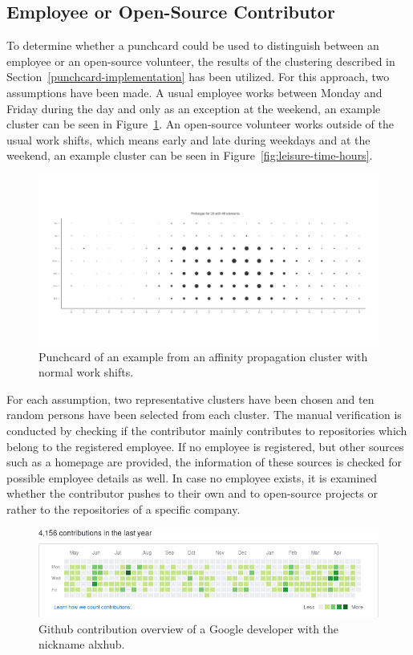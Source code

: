 \subsection{Employee or Open-Source Contributor}
To determine whether a punchcard could be used to distinguish between an employee or an open-source volunteer, the results of the clustering described in Section~\ref{punchcard-implementation} has been utilized.
For this approach, two assumptions have been made.
A usual employee works between Monday and Friday during the day and only as an exception at the weekend, an example cluster can be seen in Figure~\ref{fig:normal-office-hours}.
An open-source volunteer works outside of the usual work shifts, which means early and late during weekdays and at the weekend, an example cluster can be seen in Figure~\ref{fig:leisure-time-hours}.

\begin{figure}[H]
    \includegraphics[scale=0.32]{./graphs/analysis-affinity/28}
    \centering
    \caption{Punchcard of an example from an affinity propagation cluster with normal work shifts.}\label{fig:normal-office-hours}
\end{figure}

For each assumption, two representative clusters have been chosen and ten random persons have been selected from each cluster.
The manual verification is conducted by checking if the contributor mainly contributes to repositories which belong to the registered employee.
If no employee is registered, but other sources such as a homepage are provided, the information of these sources is checked for possible employee details as well.
In case no employee exists, it is examined whether the contributor pushes to their own and to open-source projects or rather to the repositories of a specific company.

\begin{figure}[H]
    \includegraphics[scale=0.6]{./graphs/contribution-overview-alxhub}
    \centering
    \caption{Github contribution overview of a Google developer with the nickname alxhub.}\label{fig:github-contribution-overview}
\end{figure}

